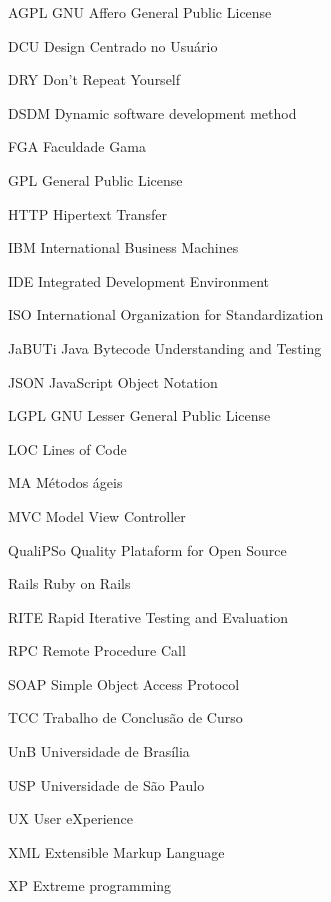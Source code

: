 \begin{siglas}

    	\item[AGPL] GNU Affero General Public License
	\item[DCU] Design Centrado no Usuário
	\item[DRY] Don't Repeat Yourself  	
  	\item[DSDM] Dynamic software development method  
	\item[FGA] Faculdade Gama
	\item[GPL] General Public License
	\item[HTTP] Hipertext Transfer	
	\item[IBM] International Business Machines
	\item[IDE] Integrated Development Environment
	\item[ISO] International Organization for Standardization  	
	\item[JaBUTi] Java Bytecode Understanding and Testing	
	\item[JSON] JavaScript Object Notation
	\item[LGPL] GNU Lesser General Public License
	\item[LOC] Lines of Code	
	\item[MA] Métodos ágeis
	\item[MVC] Model View Controller
	\item[QualiPSo] Quality Plataform for Open Source
	\item[Rails] Ruby on Rails	
	\item[RITE] Rapid Iterative Testing and Evaluation
	\item[RPC] Remote Procedure Call	
	\item[SOAP] Simple Object Access Protocol	
	\item[TCC] Trabalho de Conclusão de Curso					  
	\item[UnB] Universidade de Brasília
	\item[USP] Universidade de São Paulo	
	\item[UX] User eXperience
	\item[XML] Extensible Markup Language
	\item[XP] Extreme programming  
  
\end{siglas}
